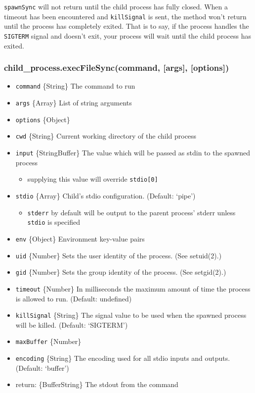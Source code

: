 \texttt{spawnSync} will not return until the child process has fully
closed. When a timeout has been encountered and \texttt{killSignal} is
sent, the method won't return until the process has completely exited.
That is to say, if the process handles the \texttt{SIGTERM} signal and
doesn't exit, your process will wait until the child process has exited.

\subsubsection{child\_process.execFileSync(command, {[}args{]},
{[}options{]})}\label{childux5fprocess.execfilesynccommand-args-options}

\begin{itemize}
\itemsep1pt\parskip0pt
\item
  \texttt{command} \{String\} The command to run
\item
  \texttt{args} \{Array\} List of string arguments
\item
  \texttt{options} \{Object\}
\item
  \texttt{cwd} \{String\} Current working directory of the child process
\item
  \texttt{input} \{String\textbar{}Buffer\} The value which will be
  passed as stdin to the spawned process

  \begin{itemize}
  \itemsep1pt\parskip0pt
  \item
    supplying this value will override \texttt{stdio{[}0{]}}
  \end{itemize}
\item
  \texttt{stdio} \{Array\} Child's stdio configuration. (Default:
  `pipe')

  \begin{itemize}
  \itemsep1pt\parskip0pt
  \item
    \texttt{stderr} by default will be output to the parent process'
    stderr unless \texttt{stdio} is specified
  \end{itemize}
\item
  \texttt{env} \{Object\} Environment key-value pairs
\item
  \texttt{uid} \{Number\} Sets the user identity of the process. (See
  setuid(2).)
\item
  \texttt{gid} \{Number\} Sets the group identity of the process. (See
  setgid(2).)
\item
  \texttt{timeout} \{Number\} In milliseconds the maximum amount of time
  the process is allowed to run. (Default: undefined)
\item
  \texttt{killSignal} \{String\} The signal value to be used when the
  spawned process will be killed. (Default: `SIGTERM')
\item
  \texttt{maxBuffer} \{Number\}
\item
  \texttt{encoding} \{String\} The encoding used for all stdio inputs
  and outputs. (Default: `buffer')
\item
  return: \{Buffer\textbar{}String\} The stdout from the command
\end{itemize}

